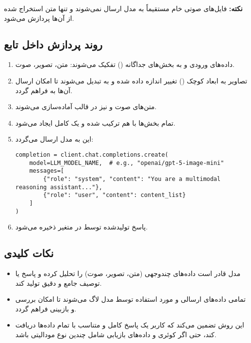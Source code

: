 \documentclass{article}
\begin{document}
\textbf{نکته:} فایل‌های صوتی خام مستقیماً به مدل ارسال نمی‌شوند و تنها متن استخراج شده از آن‌ها پردازش می‌شود.

\subsection{روند پردازش داخل تابع }
\begin{enumerate}
\item داده‌های ورودی و  به بخش‌های جداگانه () تفکیک می‌شوند: متن، تصویر، صوت.

\item تصاویر به ابعاد کوچک () تغییر اندازه داده شده و به  تبدیل می‌شوند تا امکان ارسال آن‌ها به  فراهم گردد.

\item متن‌های صوت و  نیز در قالب  آماده‌سازی می‌شوند.

\item تمام بخش‌ها با هم ترکیب شده و یک  کامل ایجاد می‌شود.

\item این  به مدل  ارسال می‌گردد:

\begin{latin}
\begin{lstlisting}
completion = client.chat.completions.create(
    model=LLM_MODEL_NAME,  # e.g., "openai/gpt-5-image-mini"
    messages=[
        {"role": "system", "content": "You are a multimodal reasoning assistant..."},
        {"role": "user", "content": content_list}
    ]
)
\end{lstlisting}
\end{latin}

\item پاسخ تولیدشده توسط  در متغیر  ذخیره می‌شود.

\end{enumerate}

\subsection{نکات کلیدی}
\begin{itemize}
\item مدل  قادر است داده‌های چندوجهی (متن، تصویر، صوت) را تحلیل کرده و پاسخ یا توصیف جامع و دقیق تولید کند.

\item تمامی داده‌های ارسالی و  مورد استفاده توسط مدل لاگ می‌شوند تا امکان بررسی و بازبینی فراهم گردد.

\item این روش تضمین می‌کند که کاربر یک پاسخ کامل و متناسب با تمام داده‌ها دریافت کند، حتی اگر کوئری و داده‌های بازیابی شامل چندین نوع مودالیتی باشد.

\end{itemize}
\end{document}
